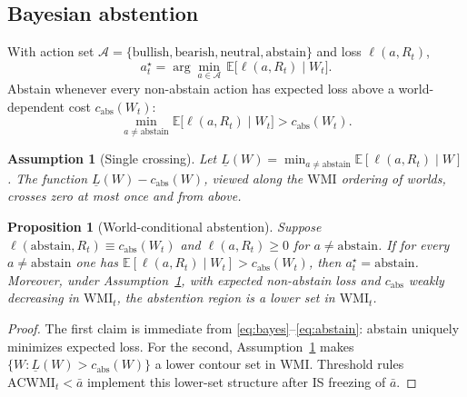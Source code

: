 \documentclass[12pt]{article}
\newtheorem{proposition}{Proposition}
\newtheorem{assumption}{Assumption}
\begin{document}
\subsection{Bayesian abstention}
With action set $\mathcal{A}=\{\mathrm{bullish},\mathrm{bearish},\mathrm{neutral},\mathrm{abstain}\}$ and loss $\ell(a,R_t)$,
\begin{equation}
a^\star_t=\arg\min_{a\in\mathcal{A}}\,\mathbb{E}\bigl[\ell(a,R_t)\mid W_t\bigr].
\label{eq:bayes}
\end{equation}
Abstain whenever every non-abstain action has expected loss above a world-dependent cost $c_{\mathrm{abs}}(W_t)$:
\begin{equation}
\min_{a\neq\mathrm{abstain}}\mathbb{E}\bigl[\ell(a,R_t)\mid W_t\bigr]>c_{\mathrm{abs}}(W_t).
\label{eq:abstain}
\end{equation}

\begin{assumption}[Single crossing]
\label{ass:singlecross}
Let $\underline L(W)=\min_{a\neq\mathrm{abstain}}\mathbb{E}[\ell(a,R_t)\mid W]$. The function $\underline L(W)-c_{\mathrm{abs}}(W)$, viewed along the $\mathrm{WMI}$ ordering of worlds, crosses zero at most once and from above.
\end{assumption}

\begin{proposition}[World-conditional abstention]
\label{prop:abstain}
Suppose $\ell(\mathrm{abstain},R_t)\equiv c_{\mathrm{abs}}(W_t)$ and $\ell(a,R_t)\ge 0$ for $a\neq\mathrm{abstain}$. If for every $a\neq\mathrm{abstain}$ one has $\mathbb{E}[\ell(a,R_t)\mid W_t]>c_{\mathrm{abs}}(W_t)$, then $a^\star_t=\mathrm{abstain}$. Moreover, under Assumption~\ref{ass:singlecross}, with expected non-abstain loss and $c_{\mathrm{abs}}$ weakly decreasing in $\mathrm{WMI}_t$, the abstention region is a lower set in $\mathrm{WMI}_t$.
\end{proposition}
\begin{proof}
The first claim is immediate from \eqref{eq:bayes}--\eqref{eq:abstain}: abstain uniquely minimizes expected loss. For the second, Assumption~\ref{ass:singlecross} makes $\{W:\underline L(W)>c_{\mathrm{abs}}(W)\}$ a lower contour set in $\mathrm{WMI}$. Threshold rules $\mathrm{ACWMI}_t<\bar a$ implement this lower-set structure after IS freezing of $\bar a$.
\end{proof}
\end{document}
